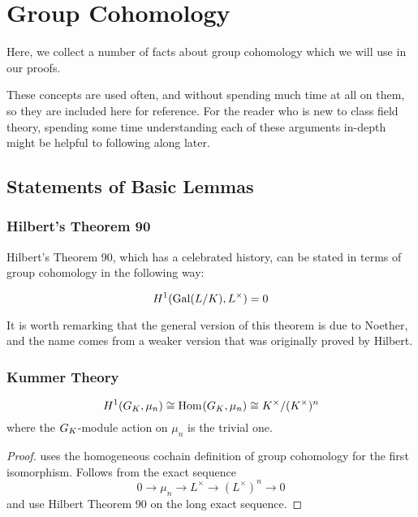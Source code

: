 
\section{Group Cohomology}

Here, we collect a number of facts about group cohomology
which we will use in our proofs. 

These concepts are used often, and without spending much
time at all on them, so they are included here for 
reference.
For the reader who is new to class field theory, 
spending some time understanding each of these
arguments in-depth might be helpful to following along later.

\subsection{Statements of Basic Lemmas}

\subsubsection{Hilbert's Theorem 90}

Hilbert's Theorem 90, which has a celebrated history,
can be stated in terms of group cohomology in the following
way:

\begin{theorem}
	\[
		H^{1}(\operatorname{Gal}(L / K), L^{\times}) = 0
	\] 
\end{theorem}

It is worth remarking that the general version of this
theorem is due to Noether, and the name comes from
a weaker version that was originally proved by Hilbert.

\subsubsection{Kummer Theory}

\begin{lemma} \coproof \label{lem:kummer:theory}
	\[
		H^{1}(G_{K},\mu_{n}) \cong 
		\operatorname{Hom}_{} (G_{K},\mu_{n}) \cong
		K^{\times} / (K^{\times})^n
	\] 
	where the \(G_{K}\)-module action on \(\mu_{n}\) is
	the trivial one.
\end{lemma}

\begin{proof}
    uses the homogeneous cochain definition
	of group cohomology for the first isomorphism.
	Follows from the exact sequence
	\[
		0 \to \mu_{n} \to L^{\times} \to (L^{\times})^{n} \to 0
	\] 
	and use Hilbert Theorem 90 on the 
	long exact sequence.
\end{proof}


